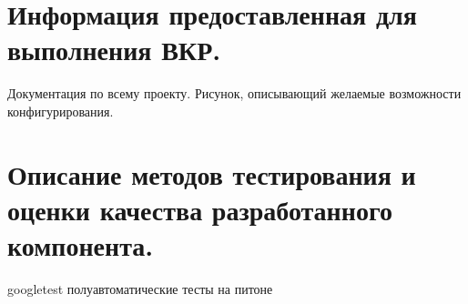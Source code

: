\documentclass[12pt]{article}
\begin{document}
\section{Информация предоставленная для выполнения ВКР.}
Документация по всему проекту.
Рисунок, описывающий желаемые возможности конфигурирования.



\section{Описание методов тестирования и оценки качества разработанного компонента.}
googletest
полуавтоматические тесты на питоне

\end{document}
